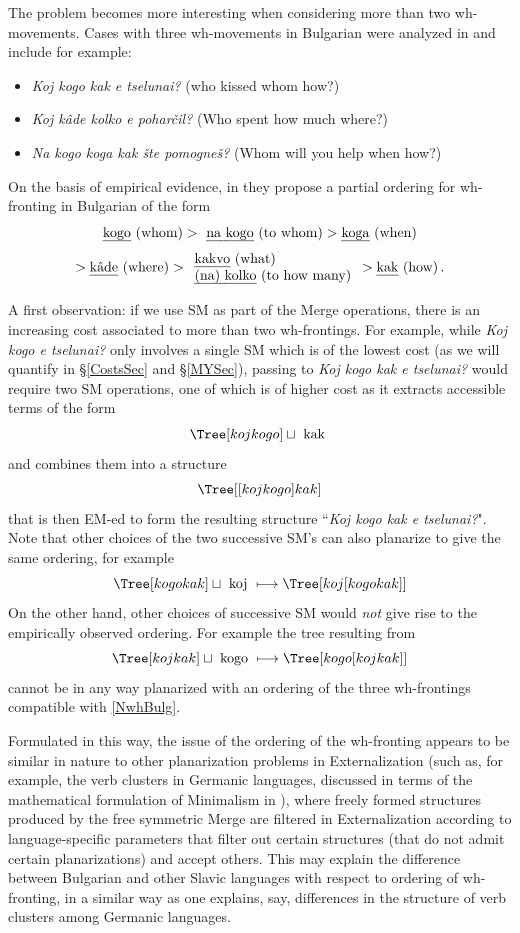 \documentclass[12pt]{amsart}
\numberwithin{equation}{section}
\begin{document}
The problem becomes more interesting when considering more than two
wh-movements. Cases with three wh-movements in Bulgarian were analyzed
in \cite{KrapCinq} and include for example:
\begin{itemize}
\item {\em Koj kogo kak e tselunai?} (who kissed whom how?)
\item {\em Koj k\^{a}de kolko e pohar\v{c}il?} (Who spent how much where?)
\item {\em Na kogo koga kak  \v{s}te pomogne\v{s}?} (Whom will you help when how?) 
\end{itemize}
On the basis of empirical evidence, in  \cite{KrapCinq} they propose a partial ordering for
wh-fronting in Bulgarian of the form
\begin{equation}\label{NwhBulg}
\text{{\em kogo} (whom)} > \text{ {\em na kogo} (to whom)} > \text{{\em koga} (when)}
\end{equation}
$$  > \text{{\em k\^{a}de} (where)} >
\begin{array}{l}
\text{{\em kakvo} (what)} \\
\text{{\em (na) kolko} (to how many)} 
\end{array}   > \text{{\em kak} (how)} \, . $$

A first observation: if we use SM as part of the Merge operations, there is an increasing
cost associated to more than two wh-frontings. For example, while {\em Koj kogo e tselunai?}
only involves a single SM which is of the lowest cost (as we will quantify in \S \ref{CostsSec} 
and \S \ref{MYSec}), passing to {\em Koj kogo kak e tselunai?} would require two SM
operations, one of which is of higher cost as it extracts accessible terms of the form
$$ \Tree[ koj kogo ] \sqcup \text{ kak } $$
and combines them into a structure
$$ \Tree[ [ koj kogo ] kak ] $$
that is then EM-ed to form the resulting structure ``{\em Koj kogo kak e tselunai?}".
Note that other choices of the two successive SM's can also planarize to give the
same ordering, for example
$$ \Tree[ kogo kak ] \sqcup \text{ koj } \longmapsto \Tree[ koj [ kogo kak ] ]  $$
On the other hand, other choices of successive SM would {\em not} give rise to the empirically observed
ordering. For example the tree resulting from
$$ \Tree[ koj kak ] \sqcup \text{ kogo } \longmapsto \Tree[ kogo [ koj kak ] ] $$
cannot be in any way planarized with an ordering of the three wh-frontings compatible with
\eqref{NwhBulg}.

Formulated in this way, the issue of the ordering of the wh-fronting appears to
be similar in nature to other planarization problems in Externalization (such as, for example,
the verb clusters in Germanic languages, discussed in terms of the mathematical formulation
of Minimalism in \cite{MHB}), where freely formed structures produced
by the free symmetric Merge are filtered in Externalization according to language-specific
parameters that filter out certain structures (that do not admit certain planarizations) and accept
others. This may explain the difference between Bulgarian and other Slavic
languages with respect to ordering of wh-fronting, in a similar way as one explains,
say, differences in the structure of verb clusters among Germanic languages.
\end{document}
